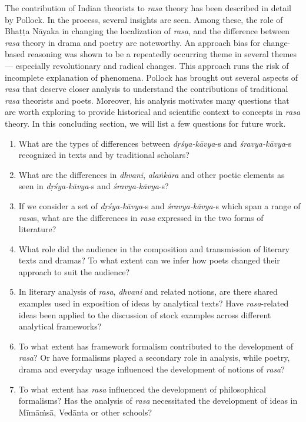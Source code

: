 The contribution of Indian theorists to \textsl{rasa} theory has been described in detail by Pollock. In the process, several insights are seen. Among these, the role of Bhaṭṭa Nāyaka in changing the localization of \textsl{rasa}, and the difference between \textsl{rasa} theory in drama and poetry are noteworthy. An approach bias for change-based reasoning was shown to be a repeatedly occurring theme in several themes --- especially revolutionary and radical changes. This approach runs the risk of incomplete explanation of phenomena. Pollock has brought out several aspects of \textsl{rasa} that deserve closer analysis to understand the contributions of traditional \textsl{rasa} theorists and poets. Moreover, his analysis motivates many questions that are worth exploring to provide historical and scientific context to concepts in \textsl{rasa} theory. In this concluding section, we will list a few questions for future work. 
\begin{enumerate}
\itemsep=1pt
\item What are the types of differences between \textsl{dṛśya-kāvya}-s and \textsl{śravya-kāvya}-s recognized in texts and by traditional scholars?
\item What are the differences in \textsl{dhvani}, \textsl{alaṅkāra} and other poetic elements as seen in \textsl{dṛśya-kāvya}-s and \textsl{śravya-kāvya}-s?
\item If we consider a set of \textsl{dṛśya-kāvya}-s and \textsl{śravya-kāvya}-s which span a range of \textsl{rasa}s, what are the differences in \textsl{rasa} expressed in the two forms of literature?
\item What role did the audience in the composition and transmission of literary texts and dramas? To what extent can we infer how poets changed their approach to suit the audience? 
\item In literary analysis of \textsl{rasa}, \textsl{dhvani} and related notions, are there shared examples used in exposition of ideas by analytical texts? Have \textsl{rasa}-related ideas been applied to the discussion of stock examples across different analytical frameworks?
\item To what extent has framework formalism contributed to the development of \textsl{rasa}? Or have formalisms played a secondary role in analysis, while poetry, drama and everyday usage influenced the development of notions of \textsl{rasa}? 
\item To what extent has \textsl{rasa} influenced the development of philosophical formalisms? Has the analysis of \textsl{rasa} necessitated the development of ideas in Mīmāṁsā, Vedānta or other schools?
\end{enumerate}

